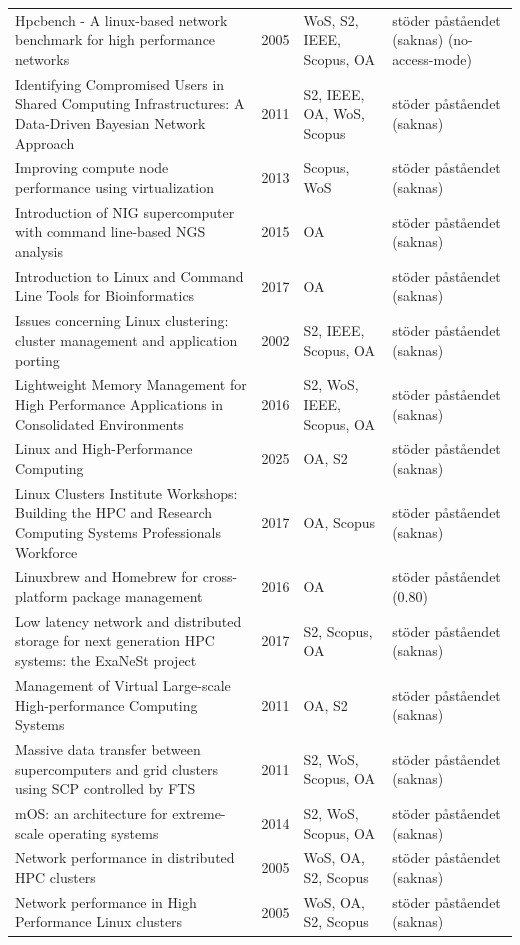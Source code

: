 \begin{longtable}{@{}%
  >{\raggedright\arraybackslash}p{}c%
  >{\raggedright\arraybackslash}p{}%
  >{\raggedright\arraybackslash}p{}@{}}
Hpcbench - A linux-based network benchmark for high performance networks & 2005 & WoS, S2, IEEE, Scopus, OA & stöder påståendet (saknas) (no-access-mode) \\
Identifying Compromised Users in Shared Computing Infrastructures: A Data-Driven Bayesian Network Approach & 2011 & S2, IEEE, OA, WoS, Scopus & stöder påståendet (saknas) \\
Improving compute node performance using virtualization & 2013 & Scopus, WoS & stöder påståendet (saknas) \\
Introduction of NIG supercomputer with command line-based NGS analysis & 2015 & OA & stöder påståendet (saknas) \\
Introduction to Linux and Command Line Tools for Bioinformatics & 2017 & OA & stöder påståendet (saknas) \\
Issues concerning Linux clustering: cluster management and application porting & 2002 & S2, IEEE, Scopus, OA & stöder påståendet (saknas) \\
Lightweight Memory Management for High Performance Applications in Consolidated Environments & 2016 & S2, WoS, IEEE, Scopus, OA & stöder påståendet (saknas) \\
Linux and High-Performance Computing & 2025 & OA, S2 & stöder påståendet (saknas) \\
Linux Clusters Institute Workshops: Building the HPC and Research Computing Systems Professionals Workforce & 2017 & OA, Scopus & stöder påståendet (saknas) \\
Linuxbrew and Homebrew for cross-platform package management & 2016 & OA & stöder påståendet (0.80) \\
Low latency network and distributed storage for next generation HPC systems: the ExaNeSt project & 2017 & S2, Scopus, OA & stöder påståendet (saknas) \\
Management of Virtual Large-scale High-performance Computing Systems & 2011 & OA, S2 & stöder påståendet (saknas) \\
Massive data transfer between supercomputers and grid clusters using SCP controlled by FTS & 2011 & S2, WoS, Scopus, OA & stöder påståendet (saknas) \\
mOS: an architecture for extreme-scale operating systems & 2014 & S2, WoS, Scopus, OA & stöder påståendet (saknas) \\
Network performance in distributed HPC clusters & 2005 & WoS, OA, S2, Scopus & stöder påståendet (saknas) \\
Network performance in High Performance Linux clusters & 2005 & WoS, OA, S2, Scopus & stöder påståendet (saknas) \\

\end{longtable}
